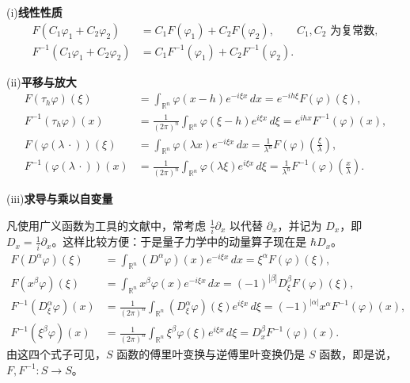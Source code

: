 \noindent(i)\textbf{线性性质}
\begin{align}
 F(C_1\varphi_1+C_2\varphi_2)&=C_1F(\varphi_1)+C_2F(\varphi_2),\qquad C_1,C_2\text{ 为复常数},
 \tag{6a}\\
 F^{-1}(C_1\varphi_1+C_2\varphi_2)&=C_1F^{-1}(\varphi_1)+C_2F^{-1}(\varphi_2).
 \tag{6b}
\end{align}

\noindent(ii)\textbf{平移与放大}
\begin{align}
 F(\tau_h\varphi)(\xi)&=\int_{\mathbb R^n}\varphi(x-h)e^{-i\xi x}\,dx
 =e^{-ih\xi}F(\varphi)(\xi),
 \tag{7a}\\
 F^{-1}(\tau_h\varphi)(x)&=\frac1{(2\pi)^n}\int_{\mathbb R^n}\varphi(\xi-h)e^{i\xi x}\,d\xi
 =e^{ihx}F^{-1}(\varphi)(x),
 \tag{7b}\\
 F(\varphi(\lambda\,\cdot))(\xi)&=\int_{\mathbb R^n}\varphi(\lambda x)e^{-i\xi x}\,dx
 =\frac1{\lambda^n}F(\varphi)\!\left(\frac\xi\lambda\right),
 \tag{8a}\\
 F^{-1}(\varphi(\lambda\,\cdot))(x)&=\frac1{(2\pi)^n}\int_{\mathbb R^n}\varphi(\lambda\xi)e^{i\xi x}\,d\xi
 =\frac1{\lambda^n}F^{-1}(\varphi)\!\left(\frac x\lambda\right).
 \tag{8b}
\end{align}

\noindent(iii)\textbf{求导与乘以自变量}

凡使用广义函数为工具的文献中，常考虑 $\frac1i\partial_x$ 以代替 $\partial_x$，并记为 $D_x$，即 $D_x=\frac1i\partial_x$。这样比较方便：于是量子力学中的动量算子现在是 $\hbar D_x$。
\begin{align}
 F(D^\alpha\varphi)(\xi)&=\int_{\mathbb R^n}(D^\alpha\varphi)(x)e^{-i\xi x}\,dx
 =\xi^\alpha F(\varphi)(\xi),
 \tag{9a}\\
 F(x^\beta\varphi)(\xi)&=\int_{\mathbb R^n}x^\beta\varphi(x)e^{-i\xi x}\,dx
 =(-1)^{|\beta|}D_\xi^\beta F(\varphi)(\xi),
 \tag{9b}\\
 F^{-1}(D_\xi^\alpha\varphi)(x)&=\frac1{(2\pi)^n}\int_{\mathbb R^n}(D_\xi^\alpha\varphi)(\xi)e^{i\xi x}\,d\xi
 =(-1)^{|\alpha|}x^\alpha F^{-1}(\varphi)(x),
 \tag{10a}\\
 F^{-1}(\xi^\beta\varphi)(x)&=\frac1{(2\pi)^n}\int_{\mathbb R^n}\xi^\beta\varphi(\xi)e^{i\xi x}\,d\xi
 =D_x^\beta F^{-1}(\varphi)(x).
 \tag{10b}
\end{align}
由这四个式子可见，$S$ 函数的傅里叶变换与逆傅里叶变换仍是 $S$ 函数，即是说，$F,F^{-1}:S\to S$。

